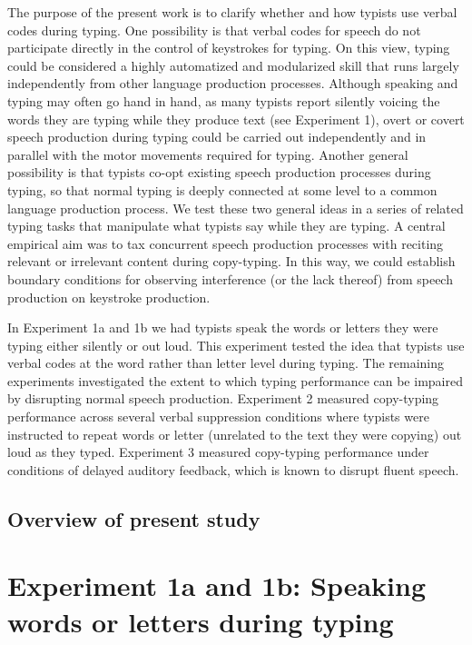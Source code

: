 \documentclass[floatsintext,man]{apa6}
\theoremstyle{definition}
\theoremstyle{definition}
\theoremstyle{definition}
\theoremstyle{remark}
\begin{document}
The purpose of the present work is to clarify whether and how typists
use verbal codes during typing. One possibility is that verbal codes for
speech do not participate directly in the control of keystrokes for
typing. On this view, typing could be considered a highly automatized
and modularized skill that runs largely independently from other
language production processes. Although speaking and typing may often go
hand in hand, as many typists report silently voicing the words they are
typing while they produce text (see Experiment 1), overt or covert
speech production during typing could be carried out independently and
in parallel with the motor movements required for typing. Another
general possibility is that typists co-opt existing speech production
processes during typing, so that normal typing is deeply connected at
some level to a common language production process. We test these two
general ideas in a series of related typing tasks that manipulate what
typists say while they are typing. A central empirical aim was to tax
concurrent speech production processes with reciting relevant or
irrelevant content during copy-typing. In this way, we could establish
boundary conditions for observing interference (or the lack thereof)
from speech production on keystroke production.

In Experiment 1a and 1b we had typists speak the words or letters they
were typing either silently or out loud. This experiment tested the idea
that typists use verbal codes at the word rather than letter level
during typing. The remaining experiments investigated the extent to
which typing performance can be impaired by disrupting normal speech
production. Experiment 2 measured copy-typing performance across several
verbal suppression conditions where typists were instructed to repeat
words or letter (unrelated to the text they were copying) out loud as
they typed. Experiment 3 measured copy-typing performance under
conditions of delayed auditory feedback, which is known to disrupt
fluent speech.

\subsection{Overview of present study}\label{overview-of-present-study}

\section{Experiment 1a and 1b: Speaking words or letters during
typing}\label{experiment-1a-and-1b-speaking-words-or-letters-during-typing}
\end{document}
